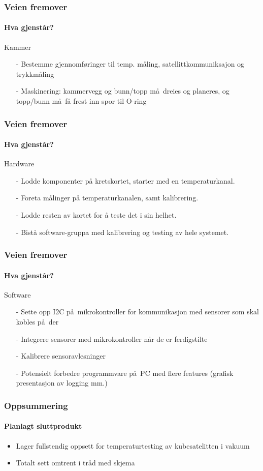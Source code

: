 \documentclass{beamer}
\begin{document}
  \begin{frame}
    \frametitle{Veien fremover}
    \framesubtitle{Hva gjenst\aa r?}
        \begin{block}{Kammer}
    	\begin{itemize}
    		\item[-] Bestemme gjennomf\o ringer til temp. m\aa ling, satellittkommuniksajon og trykkm\aa ling
    		\item[-] Maskinering: kammervegg og bunn/topp m\aa\ dreies og planeres, og topp/bunn m\aa\ få frest inn spor til O-ring
    	\end{itemize}
    \end{block}
    \end{frame}
    
    \begin{frame}
    	\frametitle{Veien fremover}
    	\framesubtitle{Hva gjenst\aa r?}
    	\begin{block}{Hardware}
    		\begin{itemize}
    			\item[-] Lodde komponenter på kretskortet, starter med en temperaturkanal.
					\item[-] Foreta målinger på temperaturkanalen, samt kalibrering.
					\item[-] Lodde resten av kortet for å teste det i sin helhet.
					\item[-] Bistå software-gruppa med kalibrering og testing av hele systemet.
    		\end{itemize}
    	\end{block}
    \end{frame}
    
    \begin{frame}
    \frametitle{Veien fremover}
    \framesubtitle{Hva gjenst\aa r?}
    \begin{block}{Software}
    	\begin{itemize}
    	\item[-] Sette opp I2C p\aa\ mikrokontroller for kommunikasjon med sensorer som skal kobles p\aa\ der
    	\item[-] Integrere sensorer med mikrokontroller n\aa r de er ferdigstilte
    	\item[-] Kalibrere sensoravlesninger
    	\item[-] Potensielt forbedre programmvare p\aa\ PC med flere features (grafisk presentasjon av logging mm.)
    	\end{itemize}
    \end{block}
  \end{frame}
  \begin{frame}
    \frametitle{Oppsummering}
    \framesubtitle{Planlagt sluttprodukt}
    \begin{itemize}
    	\item Lager fullstendig oppsett for temperaturtesting av kubesatelitten i vakuum
    	\item Totalt sett omtrent i tr\aa d med skjema
    \end{itemize}
  \end{frame}
\end{document}
